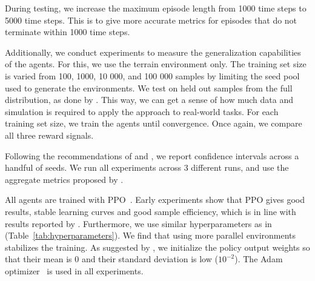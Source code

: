 During testing, we increase the maximum episode length from 1000 time steps to 5000 time steps.
This is to give more accurate metrics for episodes that do not terminate within 1000 time steps. 

Additionally, we conduct experiments to measure the generalization capabilities of the agents.
For this, we use the terrain environment only.
The training set size is varied from 100, 1000, 10 000, and 100 000 samples by limiting the seed pool used to generate the environments.
We test on held out samples from the full distribution, as done by \cite{cobbe_procgen_2020}.
This way, we can get a sense of how much data and simulation is required to apply the approach to real-world tasks.
For each training set size, we train the agents until convergence.
Once again, we compare all three reward signals.

Following the recommendations of \cite{henderson_matters_2018} and \cite{agarwal_rlliable_2022}, we report confidence intervals across a handful of seeds.
We run all experiments across 3 different runs, and use the aggregate metrics proposed by \cite{agarwal_rlliable_2022}.

All agents are trained with PPO~\cite{schulman_ppo_2017}.
Early experiments show that PPO gives good results, stable learning curves and good sample efficiency, which is in line with results reported by \cite{andrychowicz_empirical_2020}.
Furthermore, we use similar hyperparameters as in \cite{cobbe_procgen_2020} (Table~\ref{tab:hyperparameters}).
We find that using more parallel environments stabilizes the training.
As suggested by \cite{andrychowicz_empirical_2020}, we initialize the policy output weights so that their mean is 0 and their standard deviation is low (\(10^{-2}\)).
The Adam optimizer~\cite{kingma_ba_2017} is used in all experiments.

